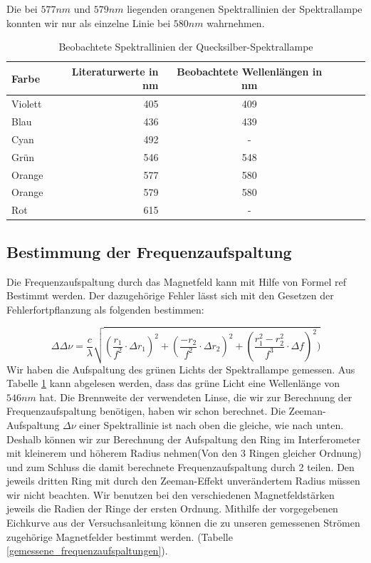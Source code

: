 \documentclass[10pt,a4paper]{article}
\begin{document}
Die bei $577nm$ und $579nm$ liegenden orangenen Spektrallinien der Spektrallampe konnten wir nur als einzelne Linie bei $580nm$ wahrnehmen.

\begin{table}[h!]
	\centering
\begin{tabular}{|l|r|c|lrp{16cm}}\hline
	Farbe & Literaturwerte in nm & Beobachtete Wellenlängen in nm\\\hline
	Violett & 405 & 409\\
	Blau & 436 & 439\\
	Cyan & 492 & -\\
	Grün & 546 & 548\\
	Orange & 577 & 580\\
	Orange & 579 & 580\\
	Rot & 615 & -\\\hline
\end{tabular}
	\caption{Beobachtete Spektrallinien der Quecksilber-Spektrallampe}
	\label{spektrum}
\end{table}


\subsection{Bestimmung der Frequenzaufspaltung}

Die Frequenzaufspaltung durch das Magnetfeld kann mit Hilfe von Formel ref Bestimmt werden. Der dazugehörige Fehler lässt sich mit den Gesetzen der Fehlerfortpflanzung als folgenden bestimmen:

\begin{equation}
\Delta\Delta\nu = \frac{c}{\lambda} \sqrt{(\frac{r_1}{f^2} \cdot\Delta r_1)^2 + (\frac{-r_2}{f^2}\cdot \Delta r_2)^2 + (\frac{r_1^2 - r_2^2}{f^3} \cdot \Delta f)^2)}
\label{fehler123}
\end{equation}
 Wir haben die Aufspaltung des grünen Lichts der Spektrallampe gemessen. Aus Tabelle \ref{spektrum} kann abgelesen werden, dass das grüne Licht eine Wellenlänge von $546 nm$ hat. Die Brennweite der verwendeten Linse, die wir zur Berechnung der Frequenzaufspaltung benötigen, haben wir schon berechnet.
Die Zeeman-Aufspaltung $\Delta\nu$ einer Spektrallinie ist nach oben die gleiche, wie nach unten. Deshalb können wir zur Berechnung der Aufspaltung den Ring im Interferometer mit kleinerem und höherem Radius nehmen(Von den 3 Ringen gleicher Ordnung) und zum Schluss die damit berechnete Frequenzaufspaltung durch 2 teilen. Den jeweils dritten Ring mit durch den Zeeman-Effekt unverändertem Radius müssen wir nicht beachten. Wir benutzen bei den verschiedenen Magnetfeldstärken jeweils die Radien der Ringe der ersten Ordnung. 
Mithilfe der vorgegebenen Eichkurve aus der Versuchsanleitung können die zu unseren gemessenen Strömen zugehörige Magnetfelder bestimmt werden. (Tabelle \ref{gemessene_frequenzaufspaltungen}).
\end{document}
